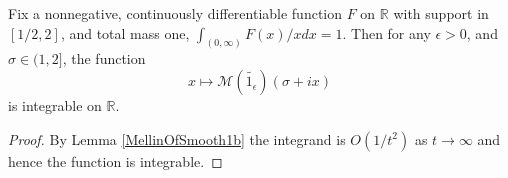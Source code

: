 \begin{lemma}
\label{SmoothedChebyshevDirichlet_aux_integrable}
\leanok
Fix a nonnegative, continuously differentiable function $F$ on $\mathbb{R}$ with support in
  $[1/2,2]$, and total mass one, $\int_{(0,\infty)} F(x)/x dx = 1$. Then for any $\epsilon>0$,
  and $\sigma\in (1, 2]$, the function
  $$
  x \mapsto\mathcal{M}(\widetilde{1_{\epsilon}})(\sigma + ix)
  $$
  is integrable on $\mathbb{R}$.
\end{lemma}
\begin{proof}
\leanok
By Lemma \ref{MellinOfSmooth1b} the integrand is $O(1/t^2)$ as $t\rightarrow \infty$ and hence
  the function is integrable.
\end{proof}
